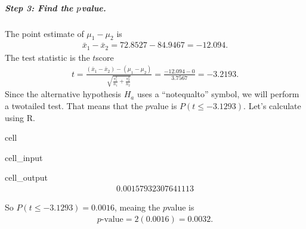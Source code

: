 \documentclass[letterpaper,10pt,english]{jupyterBook}
\begin{document}
\subparagraph{Step 3: Find the  \protect\(p\protect\)\sphinxhyphen{}value.}
\label{\detokenize{Ch9 Hypothesis Tests of Two or More Populations/9.1 Hypothesis Testing Two Population Means:id4}}
\sphinxAtStartPar
The point estimate of \(\mu_1 - \mu_2\) is
\begin{equation*}
\begin{split} \bar{x}_1 - \bar{x}_2 = 72.8527 - 84.9467 = -12.094. \end{split}
\end{equation*}
\sphinxAtStartPar
The test statistic is the \(t\)\sphinxhyphen{}score
\begin{equation*}
\begin{split} t = \frac{(\bar{x}_1 - \bar{x}_2) - (\mu_1 - \mu_2)}{\sqrt{\frac{s_1^2}{n_1} + \frac{s_2^2}{n_2}}} = \frac{-12.094 - 0}{3.7567} = -3.2193. \end{split}
\end{equation*}
\sphinxAtStartPar
Since the alternative hypothesis \(H_a\) uses a “not\sphinxhyphen{}equal\sphinxhyphen{}to” symbol, we will perform a two\sphinxhyphen{}tailed test. That means that  the \(p\)\sphinxhyphen{}value is \(P(t \leq -3.1293)\). Let’s calculate using R.

\begin{sphinxuseclass}{cell}\begin{sphinxVerbatimInput}

\begin{sphinxuseclass}{cell_input}
\begin{sphinxVerbatim}[commandchars=\\\{\}]
\end{sphinxVerbatim}

\end{sphinxuseclass}\end{sphinxVerbatimInput}
\begin{sphinxVerbatimOutput}

\begin{sphinxuseclass}{cell_output}\begin{equation*}
\begin{split}0.00157932307641113\end{split}
\end{equation*}
\end{sphinxuseclass}\end{sphinxVerbatimOutput}

\end{sphinxuseclass}
\sphinxAtStartPar
So \(P(t \leq -3.1293) = 0.0016\), meaing the \(p\)\sphinxhyphen{}value is
\begin{equation*}
\begin{split} p\text{-value} = 2(0.0016) = 0.0032. \end{split}
\end{equation*}
\end{document}
